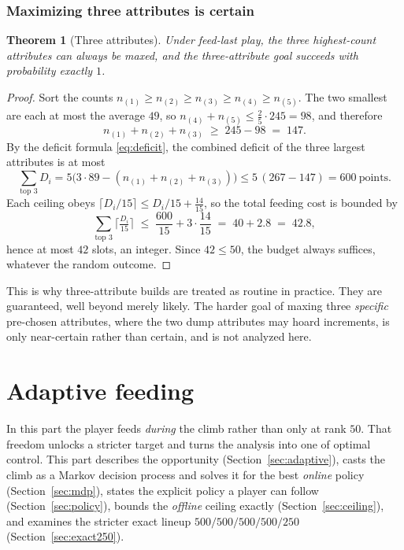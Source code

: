 \documentclass[11pt]{article}
\newtheorem{theorem}{Theorem}
\theoremstyle{remark}
\begin{document}
\section{Maximizing three attributes is certain}\label{sec:three}

\begin{theorem}[Three attributes]\label{thm:three}
Under feed-last play, the three highest-count attributes can always be maxed, and the
three-attribute goal succeeds with probability exactly $1$.
\end{theorem}

\begin{proof}
Sort the counts $n_{(1)}\ge n_{(2)}\ge n_{(3)}\ge n_{(4)}\ge n_{(5)}$. The two
smallest are each at most the average $49$, so $n_{(4)}+n_{(5)}\le \tfrac{2}{5}\cdot
245 = 98$, and therefore
\[
   n_{(1)}+n_{(2)}+n_{(3)}\;\ge\;245-98\;=\;147.
\]
By the deficit formula \eqref{eq:deficit}, the combined deficit of the three largest
attributes is at most
\[
   \sum_{\text{top }3} D_i
   = 5\big(3\cdot 89-(n_{(1)}+n_{(2)}+n_{(3)})\big)
   \le 5\,(267-147) = 600\ \text{points.}
\]
Each ceiling obeys $\lceil D_i/15\rceil \le D_i/15 + \tfrac{14}{15}$, so the total
feeding cost is bounded by
\[
   \sum_{\text{top }3}\Big\lceil \tfrac{D_i}{15}\Big\rceil
   \;\le\; \frac{600}{15}+3\cdot\frac{14}{15}
   \;=\;40+2.8\;=\;42.8,
\]
hence at most $42$ slots, an integer. Since $42\le 50$, the budget always suffices,
whatever the random outcome.
\end{proof}

This is why three-attribute builds are treated as routine in practice. They are
guaranteed, well beyond merely likely. The harder goal of maxing three \emph{specific}
pre-chosen attributes, where the two dump attributes may hoard increments, is only
near-certain rather than certain, and is not analyzed here.

\part{Adaptive feeding}

In this part the player feeds \emph{during} the climb rather than only at rank $50$.
That freedom unlocks a stricter target and turns the analysis into one of optimal
control. This part describes the opportunity (Section~\ref{sec:adaptive}), casts the climb as a
Markov decision process and solves it for the best \emph{online} policy
(Section~\ref{sec:mdp}), states the explicit policy a player can follow
(Section~\ref{sec:policy}), bounds the \emph{offline} ceiling exactly
(Section~\ref{sec:ceiling}), and examines the stricter exact lineup
$500/500/500/500/250$ (Section~\ref{sec:exact250}).
\end{document}
